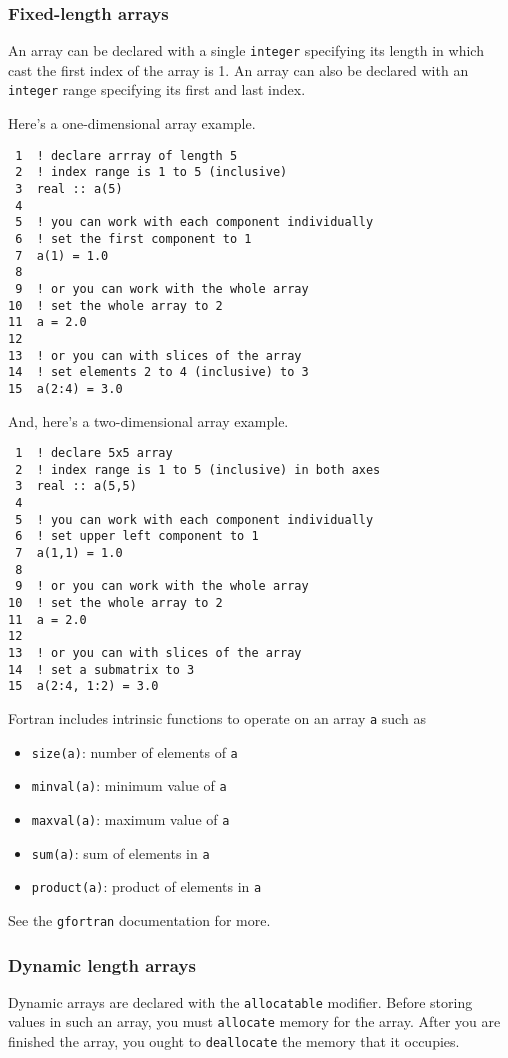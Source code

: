 \documentclass[11pt]{article}
\begin{document}
\subsubsection{Fixed-length arrays}
\label{sec:orgheadline20}
An array can be declared with a single \texttt{integer} specifying its length in which cast the first index of the array is 1. An array can also be declared with an \texttt{integer} range specifying its first and last index.

Here's a one-dimensional array example.
\begin{verbatim}
 1  ! declare arrray of length 5
 2  ! index range is 1 to 5 (inclusive)
 3  real :: a(5)
 4  
 5  ! you can work with each component individually
 6  ! set the first component to 1
 7  a(1) = 1.0
 8  
 9  ! or you can work with the whole array
10  ! set the whole array to 2
11  a = 2.0
12  
13  ! or you can with slices of the array
14  ! set elements 2 to 4 (inclusive) to 3
15  a(2:4) = 3.0
\end{verbatim}

And, here's a two-dimensional array example.
\begin{verbatim}
 1  ! declare 5x5 array
 2  ! index range is 1 to 5 (inclusive) in both axes
 3  real :: a(5,5)
 4  
 5  ! you can work with each component individually
 6  ! set upper left component to 1
 7  a(1,1) = 1.0
 8  
 9  ! or you can work with the whole array
10  ! set the whole array to 2
11  a = 2.0
12  
13  ! or you can with slices of the array
14  ! set a submatrix to 3
15  a(2:4, 1:2) = 3.0
\end{verbatim}

Fortran includes intrinsic functions to operate on an array \texttt{a} such as
\begin{itemize}
\item \texttt{size(a)}: number of elements of \texttt{a}
\item \texttt{minval(a)}: minimum value of \texttt{a}
\item \texttt{maxval(a)}: maximum value of \texttt{a}
\item \texttt{sum(a)}: sum of elements in \texttt{a}
\item \texttt{product(a)}: product of elements in \texttt{a}
\end{itemize}
See the \texttt{gfortran} documentation for more.

\subsubsection{Dynamic length arrays}
\label{sec:orgheadline21}
Dynamic arrays are declared with the \texttt{allocatable} modifier. Before storing values in such an array, you must \texttt{allocate} memory for the array. After you are finished the array, you ought to \texttt{deallocate} the memory that it occupies.
\end{document}
